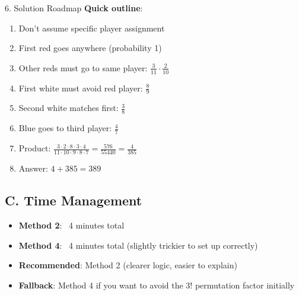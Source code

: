 \documentclass[12pt]{article}
\begin{document}
\begin{roadmapbox}{6. Solution Roadmap}
\textbf{Quick outline}:
\begin{enumerate}
    \item Don't assume specific player assignment
    \item First red goes anywhere (probability 1)
    \item Other reds must go to same player: $\frac{3}{11} \cdot \frac{2}{10}$
    \item First white must avoid red player: $\frac{8}{9}$
    \item Second white matches first: $\frac{3}{8}$
    \item Blue goes to third player: $\frac{4}{7}$
    \item Product: $\frac{3 \cdot 2 \cdot 8 \cdot 3 \cdot 4}{11 \cdot 10 \cdot 9 \cdot 8 \cdot 7} = \frac{576}{55440} = \frac{4}{385}$
    \item Answer: $4 + 385 = 389$
\end{enumerate}

\subsection*{C. Time Management}
\begin{itemize}[leftmargin=*]
    \item \textbf{Method 2}: ~4 minutes total
    \item \textbf{Method 4}: ~4 minutes total (slightly trickier to set up correctly)
    \item \textbf{Recommended}: Method 2 (clearer logic, easier to explain)
    \item \textbf{Fallback}: Method 4 if you want to avoid the $3!$ permutation factor initially
\end{itemize}

\end{roadmapbox}
\end{document}
